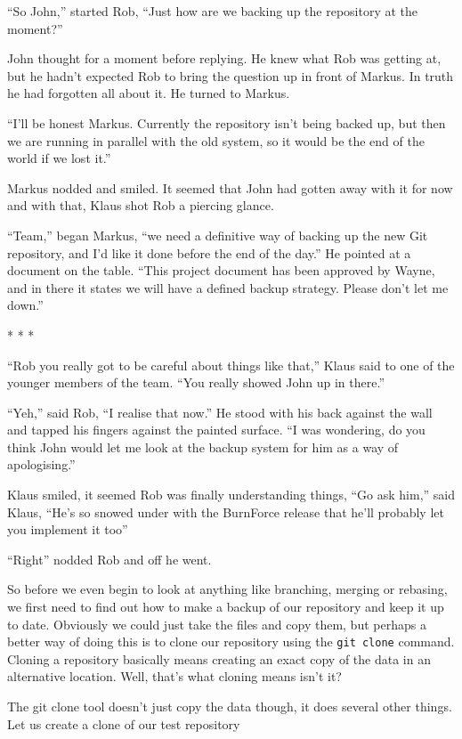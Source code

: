 \begin{trenches}
``So John,'' started Rob, ``Just how are we backing up the repository at the moment?''

John thought for a moment before replying.  He knew what Rob was getting at, but he hadn't expected Rob to bring the question up in front of Markus.  In truth he had forgotten all about it.  He turned to Markus.

``I'll be honest Markus.  Currently the repository isn't being backed up, but then we are running in parallel with the old system, so it would be the end of the world if we lost it.''

Markus nodded and smiled.  It seemed that John had gotten away with it for now and with that, Klaus shot Rob a piercing glance.  

``Team,'' began Markus, ``we need a definitive way of backing up the new Git repository, and I'd like it done before the end of the day.''  He pointed at a document on the table.  ``This project document has been approved by Wayne, and in there it states we will have a defined backup strategy.  Please don't let me down.''

\begin{center} * * * \end{center}

``Rob you really got to be careful about things like that,'' Klaus said to one of the younger members of the team.  ``You really showed John up in there.''  

``Yeh,'' said Rob, ``I realise that now.''  He stood with his back against the wall and tapped his fingers against the painted surface.  ``I was wondering, do you think John would let me look at the backup system for him as a way of apologising.''

Klaus smiled, it seemed Rob was finally understanding things, ``Go ask him,'' said Klaus, ``He's so snowed under with the BurnForce release that he'll probably let you implement it too''

``Right'' nodded Rob and off he went.
\end{trenches}

So before we even begin to look at anything like branching, merging or rebasing, we first need to find out how to make a backup of our repository and keep it up to date.  Obviously we could just take the files and copy them, but perhaps a better way of doing this is to clone our repository using the \texttt{git clone} command.  Cloning a repository basically means creating an exact copy of the data in an alternative location.  Well, that's what cloning means isn't it?

The git clone tool doesn't just copy the data though, it does several other things.  Let us create a clone of our test repository 


